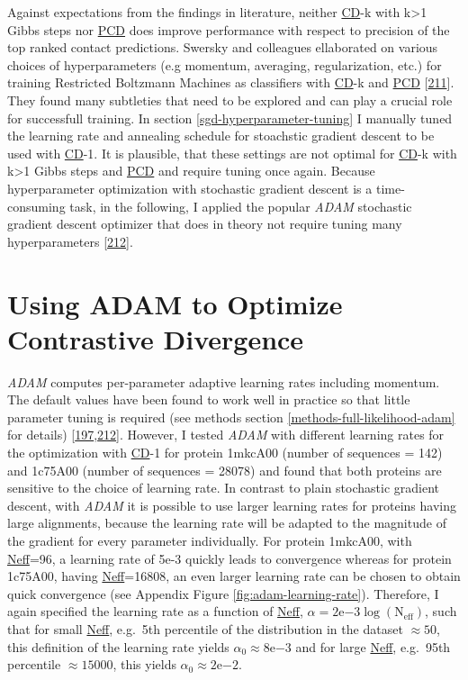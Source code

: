 \documentclass[11pt,a4paper,twoside]{book}
\theoremstyle{definition}
\theoremstyle{definition}
\theoremstyle{remark}
\begin{document}
Against expectations from the findings in literature, neither
\protect\hyperlink{abbrev}{CD}-k with k\textgreater{}1 Gibbs steps nor
\protect\hyperlink{abbrev}{PCD} does improve performance with respect to
precision of the top ranked contact predictions. Swersky and colleagues
ellaborated on various choices of hyperparameters (e.g momentum,
averaging, regularization, etc.) for training Restricted Boltzmann
Machines as classifiers with \protect\hyperlink{abbrev}{CD}-k and
\protect\hyperlink{abbrev}{PCD}
{[}\protect\hyperlink{ref-Swersky2010}{211}{]}. They found many
subtleties that need to be explored and can play a crucial role for
successfull training. In section \ref{sgd-hyperparameter-tuning} I
manually tuned the learning rate and annealing schedule for stoachstic
gradient descent to be used with \protect\hyperlink{abbrev}{CD}-1. It is
plausible, that these settings are not optimal for
\protect\hyperlink{abbrev}{CD}-k with k\textgreater{}1 Gibbs steps and
\protect\hyperlink{abbrev}{PCD} and require tuning once again. Because
hyperparameter optimization with stochastic gradient descent is a
time-consuming task, in the following, I applied the popular \emph{ADAM}
stochastic gradient descent optimizer that does in theory not require
tuning many hyperparameters
{[}\protect\hyperlink{ref-Kingma2014}{212}{]}.

\section{Using ADAM to Optimize Contrastive
Divergence}\label{adam-results}

\emph{ADAM} computes per-parameter adaptive learning rates including
momentum. The default values have been found to work well in practice so
that little parameter tuning is required (see methods section
\ref{methods-full-likelihood-adam} for details)
{[}\protect\hyperlink{ref-Ruder2017}{197},\protect\hyperlink{ref-Kingma2014}{212}{]}.
However, I tested \emph{ADAM} with different learning rates for the
optimization with \protect\hyperlink{abbrev}{CD}-1 for protein 1mkcA00
(number of sequences = 142) and 1c75A00 (number of sequences = 28078)
and found that both proteins are sensitive to the choice of learning
rate. In contrast to plain stochastic gradient descent, with \emph{ADAM}
it is possible to use larger learning rates for proteins having large
alignments, because the learning rate will be adapted to the magnitude
of the gradient for every parameter individually. For protein 1mkcA00,
with \protect\hyperlink{abbrev}{Neff}=96, a learning rate of 5e-3
quickly leads to convergence whereas for protein 1c75A00, having
\protect\hyperlink{abbrev}{Neff}=16808, an even larger learning rate can
be chosen to obtain quick convergence (see Appendix Figure
\ref{fig:adam-learning-rate}). Therefore, I again specified the learning
rate as a function of \protect\hyperlink{abbrev}{Neff},
\(\alpha = 2\mathrm{e}{-3}\log(\text{N}_{\text{eff}})\), such that for
small \protect\hyperlink{abbrev}{Neff}, e.g.~5th percentile of the
distribution in the dataset \(\approx 50\), this definition of the
learning rate yields \(\alpha_0 \approx 8\mathrm{e}{-3}\) and for large
\protect\hyperlink{abbrev}{Neff}, e.g.~95th percentile
\(\approx 15000\), this yields \(\alpha_0 \approx 2\mathrm{e}{-2}\).
\end{document}
